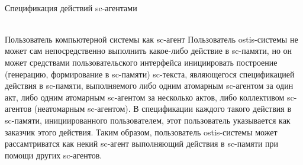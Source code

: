\begin{frame}{\\Спецификация действий sc-агентами}
	\begin{SCn}
	\end{SCn}
\end{frame}

\begin{frame}{\\Пользователь компьютерной системы как sc-агент}
	Пользователь ostis-системы не может сам непосредственно выполнить какое-либо действие в sc-памяти, но он может средствами пользовательского интерфейса инициировать построение (генерацию, формирование в sc-памяти) sc-текста, являющегося спецификацией действия в sc-памяти, выполняемого либо одним атомарным sc-агентом за один акт, либо одним атомарным sc-агентом за несколько актов, либо коллективом sc-агентов (неатомарным sc-агентом). В спецификации каждого такого действия в sc-памяти, инициированного пользователем, этот пользователь указывается как заказчик этого действия. Таким образом, пользователь ostis-системы может рассамтриватся как некий sc-агент выполняющий действия в sc-памяти при помощи других sc-агентов.
\end{frame}

